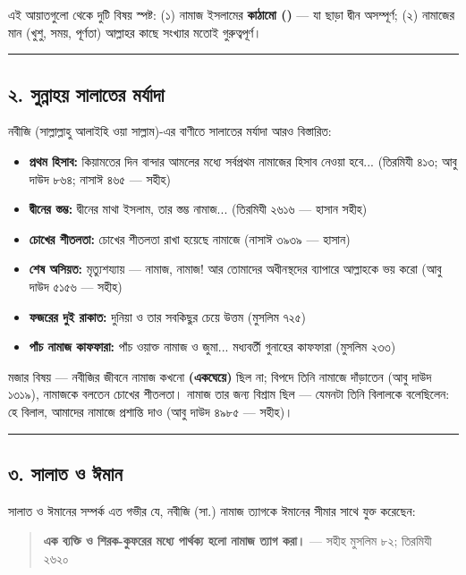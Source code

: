 এই আয়াতগুলো থেকে দুটি বিষয় স্পষ্ট: (১) নামাজ ইসলামের \textbf{কাঠামো ()} — যা ছাড়া দ্বীন অসম্পূর্ণ; (২) নামাজের মান (খুশু, সময়, পূর্ণতা) আল্লাহর কাছে সংখ্যার মতোই গুরুত্বপূর্ণ।

\medskip\hrule\medskip

\subsection*{২. সুন্নাহয় সালাতের মর্যাদা}

নবীজি (সাল্লাল্লাহু আলাইহি ওয়া সাল্লাম)-এর বাণীতে সালাতের মর্যাদা আরও বিস্তারিত:

\begin{itemize}
\item \textbf{প্রথম হিসাব:} কিয়ামতের দিন বান্দার আমলের মধ্যে সর্বপ্রথম নামাজের হিসাব নেওয়া হবে... (তিরমিযী ৪১৩; আবু দাউদ ৮৬৪; নাসাঈ ৪৬৫ — সহীহ)
\item \textbf{দ্বীনের স্তম্ভ:} দ্বীনের মাথা ইসলাম, তার স্তম্ভ নামাজ... (তিরমিযী ২৬১৬ — হাসান সহীহ)
\item \textbf{চোখের শীতলতা:} চোখের শীতলতা রাখা হয়েছে নামাজে (নাসাঈ ৩৯৩৯ — হাসান)
\item \textbf{শেষ অসিয়ত:} মৃত্যুশয্যায় — নামাজ, নামাজ! আর তোমাদের অধীনস্থদের ব্যাপারে আল্লাহকে ভয় করো (আবু দাউদ ৫১৫৬ — সহীহ)
\item \textbf{ফজরের দুই রাকাত:} দুনিয়া ও তার সবকিছুর চেয়ে উত্তম (মুসলিম ৭২৫)
\item \textbf{পাঁচ নামাজ কাফফারা:} পাঁচ ওয়াক্ত নামাজ ও জুমা... মধ্যবর্তী গুনাহের কাফফারা (মুসলিম ২৩৩)
\end{itemize}
মজার বিষয় — নবীজির জীবনে নামাজ কখনো \textbf{ (একঘেয়ে)}  ছিল না; বিপদে তিনি নামাজে দাঁড়াতেন (আবু দাউদ ১৩১৯), নামাজকে বলতেন চোখের শীতলতা। নামাজ তার জন্য বিশ্রাম ছিল — যেমনটা তিনি বিলালকে বলেছিলেন: হে বিলাল, আমাদের নামাজে প্রশান্তি দাও (আবু দাউদ ৪৯৮৫ — সহীহ)।

\medskip\hrule\medskip

\subsection*{৩. সালাত ও ঈমান}

সালাত ও ঈমানের সম্পর্ক এত গভীর যে, নবীজি (সা.) নামাজ ত্যাগকে ঈমানের সীমার সাথে যুক্ত করেছেন:

\begin{quote}
\textbf{এক ব্যক্তি ও শিরক-কুফরের মধ্যে পার্থক্য হলো নামাজ ত্যাগ করা।} — সহীহ মুসলিম ৮২; তিরমিযী ২৬২০
\end{quote}

